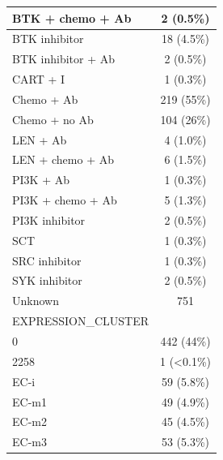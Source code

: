 \documentclass[
]{article}
\begin{document}
\begin{longtable}{l|c}
\hline
\hspace{1em}BTK + chemo + Ab & 2 (0.5\%)\\
\hline
\hspace{1em}BTK inhibitor & 18 (4.5\%)\\
\hline
\hspace{1em}BTK inhibitor + Ab & 2 (0.5\%)\\
\hline
\hspace{1em}CART + I & 1 (0.3\%)\\
\hline
\hspace{1em}Chemo + Ab & 219 (55\%)\\
\hline
\hspace{1em}Chemo + no Ab & 104 (26\%)\\
\hline
\hspace{1em}LEN + Ab & 4 (1.0\%)\\
\hline
\hspace{1em}LEN + chemo + Ab & 6 (1.5\%)\\
\hline
\hspace{1em}PI3K + Ab & 1 (0.3\%)\\
\hline
\hspace{1em}PI3K + chemo + Ab & 5 (1.3\%)\\
\hline
\hspace{1em}PI3K inhibitor & 2 (0.5\%)\\
\hline
\hspace{1em}SCT & 1 (0.3\%)\\
\hline
\hspace{1em}SRC inhibitor & 1 (0.3\%)\\
\hline
\hspace{1em}SYK inhibitor & 2 (0.5\%)\\
\hline
\hspace{1em}Unknown & 751\\
\hline
EXPRESSION\_CLUSTER & \\
\hline
\hspace{1em}0 & 442 (44\%)\\
\hline
\hspace{1em}2258 & 1 (<0.1\%)\\
\hline
\hspace{1em}EC-i & 59 (5.8\%)\\
\hline
\hspace{1em}EC-m1 & 49 (4.9\%)\\
\hline
\hspace{1em}EC-m2 & 45 (4.5\%)\\
\hline
\hspace{1em}EC-m3 & 53 (5.3\%)\\

\end{longtable}
\end{document}
